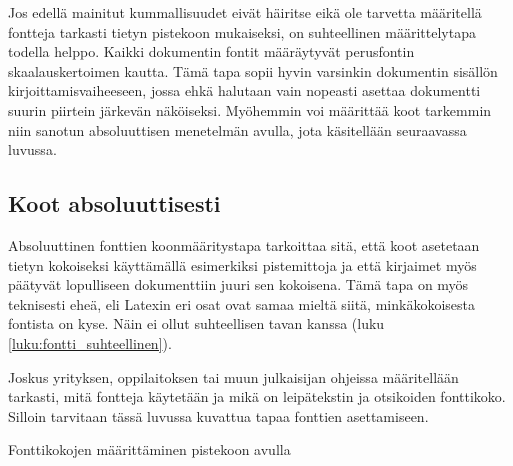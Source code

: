 Jos edellä mainitut kummallisuudet eivät häiritse eikä ole tarvetta
määritellä fontteja tarkasti tietyn pistekoon mukaiseksi, on
suhteellinen määrittelytapa todella helppo. Kaikki dokumentin fontit
määräytyvät perusfontin skaalauskertoimen kautta. Tämä tapa sopii hyvin
varsinkin dokumentin sisällön kirjoittamisvaiheeseen, jossa ehkä
halutaan vain nopeasti asettaa dokumentti suurin piirtein järkevän
näköiseksi. Myöhemmin voi määrittää koot tarkemmin niin sanotun
absoluuttisen menetelmän avulla, jota käsitellään seuraavassa luvussa.

\subsection{Koot absoluuttisesti}
\label{luku:fontti_absoluuttinen}

Absoluuttinen fonttien koonmääritystapa tarkoittaa sitä, että koot
asetetaan tietyn kokoiseksi käyttämällä esimerkiksi pistemittoja ja että
kirjaimet myös päätyvät lopulliseen dokumenttiin juuri sen kokoisena.
Tämä tapa on myös teknisesti eheä, eli Latexin eri osat ovat samaa
mieltä siitä, minkäkokoisesta fontista on kyse. Näin ei ollut
suhteellisen tavan kanssa (luku \ref{luku:fontti_suhteellinen}).

Joskus yrityksen, oppilaitoksen tai muun julkaisijan ohjeissa
määritellään tarkasti, mitä fontteja käytetään ja mikä on leipätekstin
ja otsikoiden fonttikoko. Silloin tarvitaan tässä luvussa kuvattua tapaa
fonttien asettamiseen.

\begin{esimerkki*}
\caption{Fonttikokojen määrittäminen pistekoon avulla}
\label{esim:fontti_absoluuttinen}
\end{esimerkki*}


